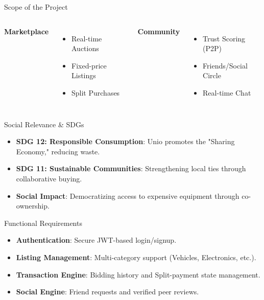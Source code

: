 \documentclass[10pt]{beamer}
\begin{document}
\begin{frame}{Scope of the Project}
    \begin{columns}
        \textbf{Marketplace}
        \begin{itemize}
            \item Real-time Auctions
            \item Fixed-price Listings
            \item Split Purchases
        \end{itemize}
        \textbf{Community}
        \begin{itemize}
            \item Trust Scoring (P2P)
            \item Friends/Social Circle
            \item Real-time Chat
        \end{itemize}
    \end{columns}
\end{frame}

\begin{frame}{Social Relevance \& SDGs}
    \begin{itemize}
        \item \textbf{SDG 12: Responsible Consumption}: Unio promotes the "Sharing Economy," reducing waste.
        \item \textbf{SDG 11: Sustainable Communities}: Strengthening local ties through collaborative buying.
        \item \textbf{Social Impact}: Democratizing access to expensive equipment through co-ownership.
    \end{itemize}
\end{frame}

\begin{frame}{Functional Requirements}
    \begin{itemize}
        \item \textbf{Authentication}: Secure JWT-based login/signup.
        \item \textbf{Listing Management}: Multi-category support (Vehicles, Electronics, etc.).
        \item \textbf{Transaction Engine}: Bidding history and Split-payment state management.
        \item \textbf{Social Engine}: Friend requests and verified peer reviews.
    \end{itemize}
\end{frame}
\end{document}
